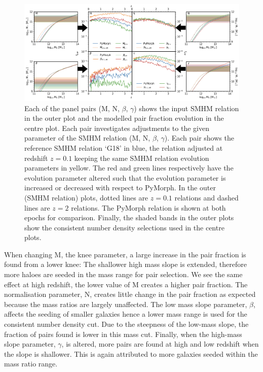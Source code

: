 \begin{landscape}
\begingroup
\begin{figure}[h]
    \centering
    \includegraphics[width = \linewidth]{Figures/Chapter5/PairFractionSystematic.png}
    \caption{Each of the panel pairs (M, N, $\beta$, $\gamma$) shows the input SMHM relation in the outer plot and the modelled pair fraction evolution in the centre plot. Each pair investigates adjustments to the given parameter of the SMHM relation (M, N, $\beta$, $\gamma$). Each pair shows the reference SMHM relation `G18' in blue, the relation adjusted at redshift $z = 0.1$ keeping the same SMHM relation evolution parameters in yellow. The red and green lines respectively have the evolution parameter altered such that the evolution parameter is increased or decreased with respect to PyMorph. In the outer (SMHM relation) plots, dotted lines are $z = 0.1$ relations and dashed lines are $z = 2$ relations. The PyMorph relation is shown at both epochs for comparison. Finally, the shaded bands in the outer plots show the consistent number density selections used in the centre plots.}
    \label{fig:PairFracSystematic}
\end{figure}
\endgroup
\end{landscape}

When changing M, the knee parameter, a large increase in the pair fraction is found from a lower knee: The shallower high mass slope is extended, therefore more haloes are seeded in the mass range for pair selection. 
We see the same effect at high redshift, the lower value of M creates a higher pair fraction. 
The normalisation parameter, N, creates little change in the pair fraction as expected because the mass ratios are largely unaffected. 
The low mass slope parameter, $\beta$, affects the seeding of smaller galaxies hence a lower mass range is used for the consistent number density cut. 
Due to the steepness of the low-mass slope, the fraction of pairs found is lower in this mass cut.
Finally, when the high-mass slope parameter, $\gamma$, is altered, more pairs are found at high and low redshift when the slope is shallower. 
This is again attributed to more galaxies seeded within the mass ratio range.

